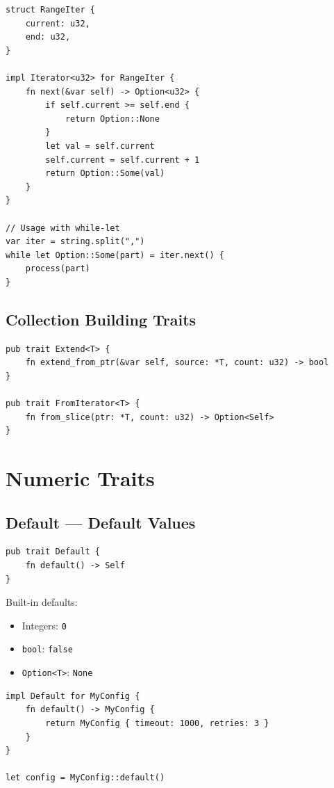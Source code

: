 \begin{lstlisting}
struct RangeIter {
    current: u32,
    end: u32,
}

impl Iterator<u32> for RangeIter {
    fn next(&var self) -> Option<u32> {
        if self.current >= self.end {
            return Option::None
        }
        let val = self.current
        self.current = self.current + 1
        return Option::Some(val)
    }
}

// Usage with while-let
var iter = string.split(",")
while let Option::Some(part) = iter.next() {
    process(part)
}
\end{lstlisting}

\subsection{Collection Building Traits}

\begin{lstlisting}
pub trait Extend<T> {
    fn extend_from_ptr(&var self, source: *T, count: u32) -> bool
}

pub trait FromIterator<T> {
    fn from_slice(ptr: *T, count: u32) -> Option<Self>
}
\end{lstlisting}

\section{Numeric Traits}
\label{sec:numeric-traits}

\subsection{Default --- Default Values}

\begin{lstlisting}
pub trait Default {
    fn default() -> Self
}
\end{lstlisting}

Built-in defaults:
\begin{itemize}
    \item Integers: \texttt{0}
    \item \texttt{bool}: \texttt{false}
    \item \texttt{Option<T>}: \texttt{None}
\end{itemize}

\begin{lstlisting}
impl Default for MyConfig {
    fn default() -> MyConfig {
        return MyConfig { timeout: 1000, retries: 3 }
    }
}

let config = MyConfig::default()
\end{lstlisting}

